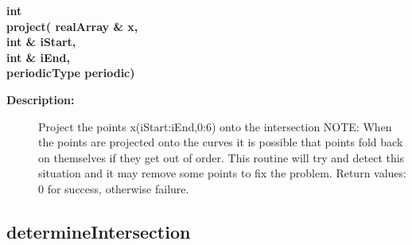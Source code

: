 \begin{flushleft} \textbf{%
int  \\ 
\settowidth{\IntersectionMappingIncludeArgIndent}{project(}%
project( realArray \& x,\\ 
\hspace{\IntersectionMappingIncludeArgIndent}int \& iStart, \\ 
\hspace{\IntersectionMappingIncludeArgIndent}int \& iEnd,\\ 
\hspace{\IntersectionMappingIncludeArgIndent}periodicType periodic)
}\end{flushleft}
\begin{description}
\item[{\bf Description:}]  
     Project the points x(iStart:iEnd,0:6) onto the intersection
  NOTE: When the points are projected onto the curves it is possible that points
      fold back on themselves if they get out of order. This routine will try and
      detect this situation and it may remove some points to fix the problem.
 Return values: 0 for success, otherwise failure.
\end{description}
\subsection{determineIntersection}
 
